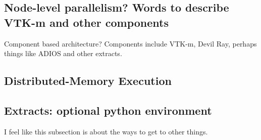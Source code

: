 \subsection{Node-level parallelism? Words to describe VTK-m and other components}

Component based architecture? Components include VTK-m, Devil Ray, perhaps things like ADIOS and other extracts.

\subsection{Distributed-Memory Execution}

\subsection{Extracts: optional python environment}
I feel like this subsection is about the ways to get to other things.
